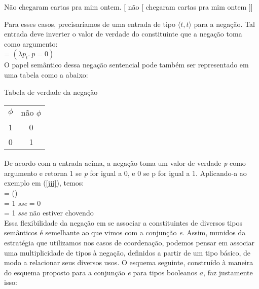\begin{exe}
\ex\label{grn}
\begin{xlist}
\ex Não chegaram cartas pra mim ontem.\label{grna}
\ex $[$ não [ chegaram cartas pra mim ontem ]]\label{grnb}
\end{xlist}
\end{exe}


\n Para esses casos, precisaríamos de uma entrada de tipo $\langle t,t\rangle$ para a negação. Tal entrada deve inverter o valor de verdade do constituinte que a negação toma como argumento: \\

\n {} = $(\lambda p_{t}.\ p=0)$\\

\n O papel semântico dessa negação sentencial pode também ser representado em uma tabela como a abaixo:

\begin{exe}
	\ex Tabela de verdade da negação\\
	
	\begin{tabular}{c||c}
		$\phi$ & não $\phi$ \\ 
		1 & 0 \\ 
		0 & 1 \\ 
	\end{tabular} 	
\end{exe}


\n De acordo com a entrada acima, a negação toma um valor de verdade \textit{p} como argumento e retorna 1 se \textit{p} for igual a 0, e 0 se p for igual a 1. Aplicando-a ao exemplo em (\ref{jjj}), temos:\\

\n {} = ()\\
 = 1 \textit{sse}  = 0\\
 = 1 \textit{sse} não estiver chovendo\\

Essa flexibilidade da negação em se associar a constituintes de diversos tipos semânticos é semelhante ao que vimos com a conjunção \textit{e}. Assim, munidos da estratégia que utilizamos nos casos de
coordena\-ção, podemos pensar em associar uma multiplicidade de tipos à
nega\-ção, definidos a partir de um tipo básico, de modo a relacionar
seus diversos usos. O esquema seguinte, construído à maneira do
esquema proposto para a conjun\-ção \textit{e} para tipos booleanos $a$, faz justamente isso:\\

